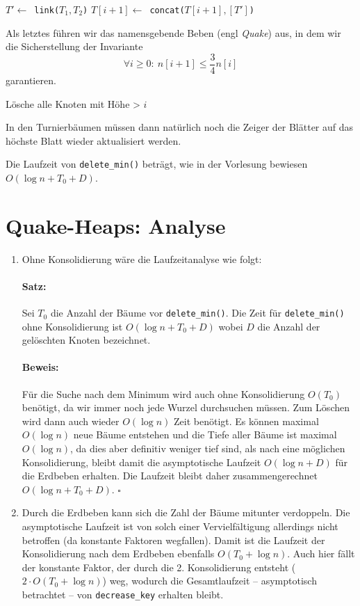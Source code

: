 \documentclass[a4paper,10pt]{article}
\begin{document}
\begin{description}
\begin{algorithmic}
            \STATE $T' \gets$\ \verb!link(!$T_1, T_2$\verb!)!
            \STATE $T[i+1] \gets$\ \verb!concat(!$T[i+1], [T']$\verb!)!
        \ENDWHILE
    \ENDFOR
    \end{algorithmic}
    Als letztes führen wir das namensgebende Beben (engl \emph{Quake}) aus, in dem wir die Sicherstellung der Invariante
    \[\forall i \geq 0{:}\ n[i+1] \leq \frac{3}{4} n[i]\]
    garantieren.
    \begin{algorithmic}
            \STATE Lösche alle Knoten mit Höhe > $i$
        \ENDIF
    \ENDFOR
    \end{algorithmic}
    In den Turnierbäumen müssen dann natürlich noch die Zeiger der Blätter auf das höchste Blatt wieder aktualisiert werden.
    
    Die Laufzeit von \verb!delete_min()! beträgt, wie in der Vorlesung bewiesen $O(\log n + T_0 + D)$.
\end{description}

\section{Quake-Heaps: Analyse}
\begin{enumerate}
\item   Ohne Konsolidierung wäre die Laufzeitanalyse wie folgt:
        \paragraph*{Satz:} Sei $T_0$ die Anzahl der Bäume vor \verb!delete_min()!. Die Zeit für \verb!delete_min()! ohne Konsolidierung ist $O(\log n + T_0 + D)$ wobei $D$ die Anzahl der gelöschten Knoten bezeichnet.
        \paragraph*{Beweis:} Für die Suche nach dem Minimum wird auch ohne Konsolidierung $O(T_0)$ benötigt, da wir immer noch jede Wurzel durchsuchen müssen.
        Zum Löschen wird dann auch wieder $O(\log n)$ Zeit benötigt.
        Es können maximal $O(\log n)$ neue Bäume entstehen und die Tiefe aller Bäume ist maximal $O(\log n)$, da dies aber definitiv weniger tief sind, als nach eine möglichen Konsolidierung, bleibt damit die asymptotische Laufzeit $O(\log n + D)$ für die Erdbeben erhalten.
        Die Laufzeit bleibt daher zusammengerechnet $O(\log n + T_0 + D)$. \hfill $\square$
\item   Durch die Erdbeben kann sich die Zahl der Bäume mitunter verdoppeln. 
        Die asymptotische Laufzeit ist von solch einer Vervielfältigung allerdings nicht betroffen (da konstante Faktoren wegfallen).
        Damit ist die Laufzeit der Konsolidierung nach dem Erdbeben ebenfalls $O(T_0 + \log n)$.
        Auch hier fällt der konstante Faktor, der durch die 2. Konsolidierung entsteht ($2 \cdot O(T_0 + \log n)$) weg, wodurch die Gesamtlaufzeit -- asymptotisch betrachtet -- von \verb!decrease_key! erhalten bleibt.
\end{enumerate}
\end{document}
